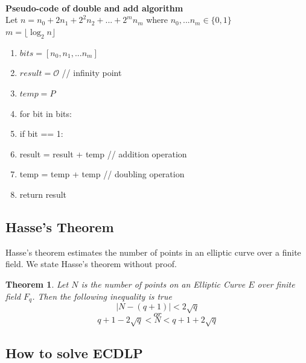 \documentclass[a4paper,12pt]{report}
\newtheorem{theorem}{Theorem}
\begin{document}
\\\\\\
\textbf{Pseudo-code of double and add algorithm}\\
Let $n=n_0+2n_1+2^2n_2+...+2^mn_m$ where $n_0,...n_m \in \{0,1\}$\\$m =\lfloor \log_2 {n} \rfloor$
\begin{enumerate}
	\item $bits = [n_0,n_1,...n_m]$
	\item $result=\mathscr{O}$ \hspace{10mm} //  infinity point
	\item $temp=P$
	\item for bit in bits:
	\item \hspace{10mm}  if bit == 1:
	\item \hspace{10mm} \hspace{10mm}  result = result + temp \hspace{10mm}// addition operation
	\item \hspace{10mm} temp = temp + temp \hspace{10mm}  // doubling operation
	\item return result
\end{enumerate}
\subsection{Hasse's Theorem}
Hasse's theorem estimates the number of points in an elliptic curve over a finite field. We state Hasse's theorem without proof.
\begin{theorem}
	Let $N$ is the number of points on an Elliptic Curve $E$ over finite field $F_q$. Then the following inequality is true
	$$|N-(q+1)|<2\sqrt{q}$$
	$$or$$
	$$q+1-2\sqrt{q}<N<q+1+2\sqrt{q}$$
\end{theorem}

\subsection{How to solve ECDLP}
\end{document}
